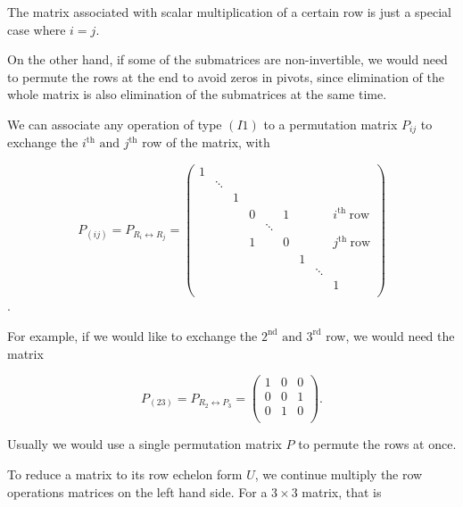 \documentclass[a4paper,12pt]{report}
\begin{document}
The matrix associated with scalar multiplication of a certain row is just a special case where \(i = j\).

On the other hand, if some of the submatrices are non-invertible, we would need to permute the rows at the end to avoid zeros in pivots, since elimination of the whole matrix is also elimination of the submatrices at the same time. 

We can associate any operation of type \((I1)\) to a permutation matrix \(P_{ij} \) to exchange the \(i^{\text{th}} \text { and } j^{\text{th}} \) row of the matrix, with 

\begin{equation}
    P_{(ij)} =  P_{R_{i} \leftrightarrow R_{j}  } = \begin{pmatrix}
        1 &  &  &  &  &  &  &  &   \\
         & \ddots  &  &  &  &  &  &  &   \\
         &  & 1 &  &  &  &  &  &   \\
         &  &  & 0 &  & 1 &  &  & i^{\text{th }}\text{row}    \\
         &  &  &  & \ddots  &  &  &  &   \\
         &  &  & 1 &  & 0 &  &  & j^{\text{th }}\text{row}   \\
         &  &  &  &  &  & 1 &  &   \\
         &  &  &  &  &  &  & \ddots  &   \\
         &  &  &  &  &  &  &  &  1 \\
    \end{pmatrix}
\end{equation}. 

For example, if we would like to exchange the \(2^{\text{nd}} \text { and } 3^{\text{rd}}\) row, we would need the matrix 

\begin{equation}
    P_{(23)} = P_{R_{2} \leftrightarrow P_{3}  } = \begin{pmatrix}
        1 & 0 &  0 \\
        0 & 0 &  1 \\
        0 & 1 &  0 \\
    \end{pmatrix}.
\end{equation}

Usually we would use a single permutation matrix \(P\) to permute the rows at once.

To reduce a matrix to its row echelon form \(U\), we continue multiply the row operations matrices on the left hand side. For a \(3 \times 3\) matrix, that is 
\end{document}
